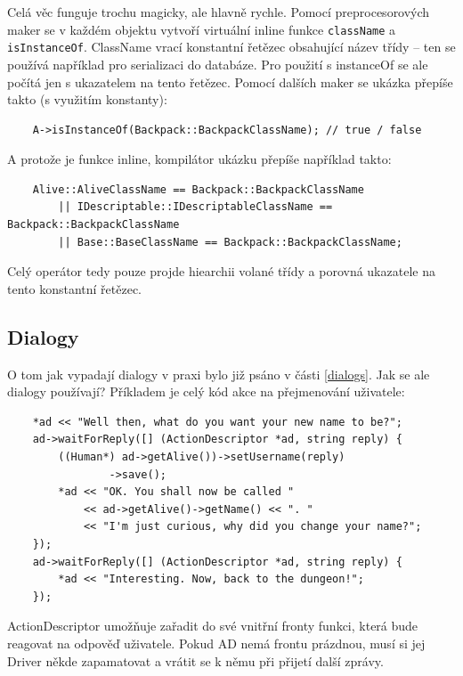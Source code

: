 \documentclass[11pt, a4paper]{article}
\begin{document}
\noindent Celá věc funguje trochu magicky, ale hlavně rychle. Pomocí preprocesorových maker se v každém objektu vytvoří virtuální inline funkce \texttt{className} a \texttt{isInstanceOf}. ClassName vrací konstantní řetězec obsahující název třídy -- ten se používá například pro serializaci do databáze. Pro použití s instanceOf se ale počítá jen s ukazatelem na tento řetězec. Pomocí dalších maker se ukázka přepíše takto (s využitím konstanty):

\begin{lstlisting}
	A->isInstanceOf(Backpack::BackpackClassName); // true / false
\end{lstlisting}

\noindent A protože je funkce inline, kompilátor ukázku přepíše například takto:

\begin{lstlisting}
	Alive::AliveClassName == Backpack::BackpackClassName 
		|| IDescriptable::IDescriptableClassName == Backpack::BackpackClassName 
		|| Base::BaseClassName == Backpack::BackpackClassName;
\end{lstlisting}

\noindent Celý operátor tedy pouze projde hiearchii volané třídy a porovná ukazatele na tento konstantní řetězec.

\subsection{Dialogy}

O tom jak vypadají dialogy v praxi bylo již psáno v části \ref{dialogs}. Jak se ale dialogy používají? Příkladem je celý kód akce na přejmenování uživatele:

\begin{lstlisting}
	*ad << "Well then, what do you want your new name to be?";
	ad->waitForReply([] (ActionDescriptor *ad, string reply) {
		((Human*) ad->getAlive())->setUsername(reply)
				->save();
		*ad << "OK. You shall now be called " 
			<< ad->getAlive()->getName() << ". "
		    << "I'm just curious, why did you change your name?";
	});
	ad->waitForReply([] (ActionDescriptor *ad, string reply) {
		*ad << "Interesting. Now, back to the dungeon!";
	});
\end{lstlisting}

\noindent ActionDescriptor umožňuje zařadit do své vnitřní fronty funkci, která bude reagovat na odpověď uživatele. Pokud AD nemá frontu prázdnou, musí si jej Driver někde zapamatovat a vrátit se k němu při přijetí další zprávy.
\end{document}
